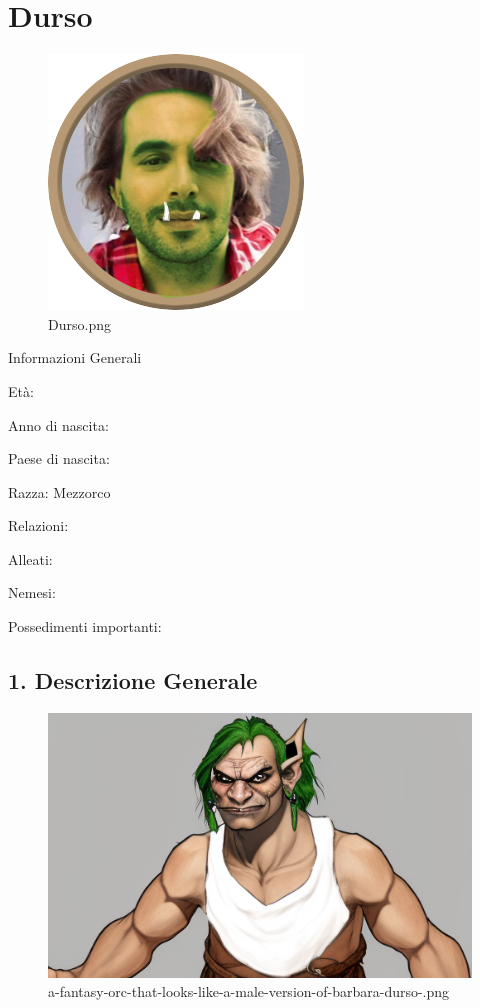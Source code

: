 \section{Durso}\label{durso}


\begin{figure}
\centering
\includegraphics{Durso.png}
\caption{Durso.png}
\end{figure}

Informazioni Generali

Età:

Anno di nascita:

Paese di nascita:

Razza: Mezzorco

Relazioni:

Alleati:

Nemesi:

Possedimenti importanti:


\subsection{1. Descrizione Generale}\label{descrizione-generale}


\begin{figure}
\centering
\includegraphics{a-fantasy-orc-that-looks-like-a-male-version-of-barbara-durso-.png}
\caption{a-fantasy-orc-that-looks-like-a-male-version-of-barbara-durso-.png}
\end{figure}

